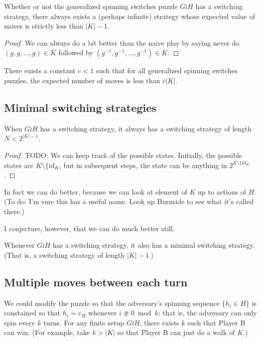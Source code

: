 \begin{proposition}
  Whether or not the generalized spinning switches puzzle $G \wr H$ has
  a switching strategy, there always exists a (perhaps infinite) strategy
  whose expected value of moves is strictly less than $|K| - 1$.
\end{proposition}
\begin{proof}
  We can always do a bit better than the naive play by saying never do
  $(g,g, ..., g) \in K$ followed by $(g^{-1},g^{-1}, ..., g^{-1}) \in K$.
\end{proof}

\begin{conjecture}
  There exists a constant $c < 1$ such that for all generalized spinning switches
  puzzles, the expected number of moves is less than $c|K|$.
\end{conjecture}

\subsection{Minimal switching strategies}
\begin{proposition}
  When $G \wr H$ has a switching strategy, it always has a switching strategy
  of length $N < 2^{|K|-1}$.
\end{proposition}
\begin{proof}
  TODO: We can keep track of the possible states. Initially, the possible
  states are $K \setminus \{\mathrm{id}_K$, but in subsequent steps, the state
  can be anything in $2^{K \setminus \{\mathrm{id}_K}$.
\end{proof}

In fact we can do better, because we can look at element of $K$ up to actions of
$H$.
(To do: I'm sure this has a useful name. Look up Burnside to see what it's called there.)

I conjecture, however, that we can do much better still.

\begin{conjecture}
  Whenever $G \wr H$ has a switching strategy, it also has a minimal switching
  strategy. (That is, a switching strategy of length $|K| - 1$.)
\end{conjecture}

\subsection{Multiple moves between each turn}
We could modify the puzzle so that the adversary's spinning sequence
$\{h_i \in H\}$ is constained so that $h_i = e_H$ whenever $i \ncong 0 \bmod k$;
that is, the adversary can only spin every $k$ turns. For any finite setup
$G \wr H$, there exists $k$ such that Player B can win.
(For example, take $k > |K|$ so that Player B can just do a walk of $K$.)

